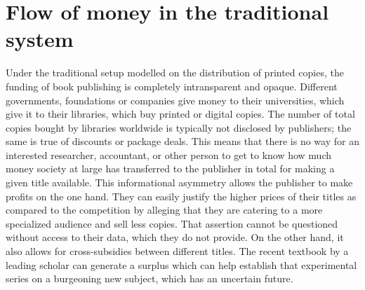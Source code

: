 \documentclass[12pt]{article}
\begin{document}
\section{Flow of money in the traditional system}
Under the traditional setup modelled on the distribution of printed copies, the funding of book publishing is completely intransparent and opaque. Different governments, foundations or companies give money to their universities, which give it to their libraries, which buy printed or digital copies. The number of total copies bought by libraries worldwide is typically not disclosed by publishers; the same is true of discounts or package deals. This means that there is no way for an interested researcher, accountant, or other person to get to know how much money society at large has transferred to the publisher in total for making a given title available.  This informational asymmetry allows the publisher to make profits on the one hand. They can easily justify the higher prices of their titles as compared to the competition by alleging that they are catering to a more specialized audience and sell less copies. That assertion cannot be questioned without access to their data, which they do not provide. On the other hand, it also allows for cross-subsidies between different titles. The recent textbook by a leading scholar can generate a surplus which can help establish that experimental series on a burgeoning new subject, which has an uncertain future. 
\end{document}
